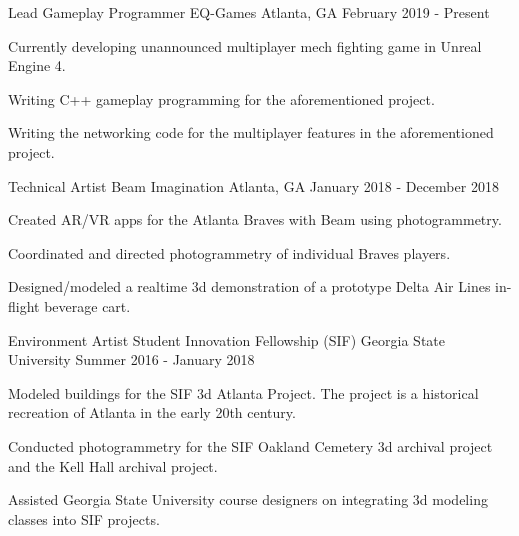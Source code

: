 

\begin{cventries}

  \cventry
    {Lead Gameplay Programmer} %
	{EQ-Games} %
    {Atlanta, GA} %
	{February 2019 - Present} %
    {
      \begin{cvitems} %
	  	\item {Currently developing unannounced multiplayer mech fighting game in Unreal Engine 4.}
        \item {Writing C++ gameplay programming for the aforementioned project.}
        \item {Writing the networking code for the multiplayer features in the aforementioned project.}
      \end{cvitems}
    }

  \cventry
    {Technical Artist} %
	{Beam Imagination} %
    {Atlanta, GA} %
	{January 2018 - December 2018} %
    {
      \begin{cvitems} %
	  	\item {Created AR/VR apps for the Atlanta Braves with Beam using photogrammetry.}
        \item {Coordinated and directed photogrammetry of individual Braves players.}
        \item {Designed/modeled a realtime 3d demonstration of a prototype Delta Air Lines in-flight beverage cart.}
      \end{cvitems}
    }

  \cventry
    {Environment Artist} %
	{Student Innovation Fellowship (SIF)} %
    {Georgia State University} %
    {Summer 2016 - January 2018} %
    {
      \begin{cvitems} %
        \item {Modeled buildings for the SIF 3d Atlanta Project. The project is a historical recreation of Atlanta in the early 20th century.}
        \item {Conducted photogrammetry for the SIF Oakland Cemetery 3d archival project and the Kell Hall archival project.}
        \item {Assisted Georgia State University course designers on integrating 3d modeling classes into SIF projects.}
      \end{cvitems}
    }


\end{cventries}
